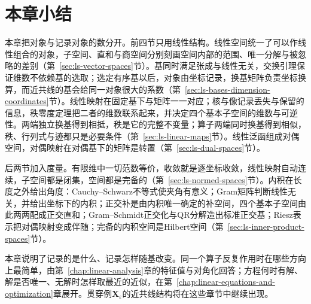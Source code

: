 
\section{本章小结}
\label{sec:ls-representation-summary}

本章把对象与记录对象的数分开。前四节只用线性结构。线性空间统一了可以作线性组合的对象，子空间、直和与商空间分别刻画空间内部的范围、唯一分解与被忽略的差别（第~\ref{sec:ls-vector-spaces}节）。基同时满足张成与线性无关，交换引理保证维数不依赖基的选取；选定有序基以后，对象由坐标记录，换基矩阵负责坐标换算，而近共线的基会给同一对象很大的系数（第~\ref{sec:ls-bases-dimension-coordinates}节）。线性映射在固定基下与矩阵一一对应；核与像记录丢失与保留的信息，秩零度定理把二者的维数联系起来，并决定四个基本子空间的维数与可逆性。两端独立换基得到相抵，秩是它的完整不变量；算子两端同时换基得到相似，秩、行列式与迹都只是必要条件（第~\ref{sec:ls-linear-maps}节）。线性泛函组成对偶空间，对偶映射在对偶基下的矩阵是转置（第~\ref{sec:ls-dual-spaces}节）。

后两节加入度量。有限维中一切范数等价，收敛就是逐坐标收敛，线性映射自动连续，子空间都是闭集，空间都是完备的（第~\ref{sec:ls-normed-spaces}节）。内积在长度之外给出角度：Cauchy--Schwarz不等式使夹角有意义；Gram矩阵判断线性无关，并给出坐标下的内积；正交补是由内积唯一确定的补空间，四个基本子空间由此两两配成正交直和；Gram--Schmidt正交化与QR分解造出标准正交基；Riesz表示把对偶映射变成伴随；完备的内积空间是Hilbert空间（第~\ref{sec:ls-inner-product-spaces}节）。

本章说明了记录的是什么、记录怎样随基改变。同一个算子反复作用时在哪些方向上最简单，由第~\ref{chap:linear-analysis}章的特征值与对角化回答；方程何时有解、解是否唯一、无解时怎样取最近的近似，在第~\ref{chap:linear-equations-and-optimization}章展开。贯穿例$\bm X_\varepsilon$的近共线结构将在这些章节中继续出现。
